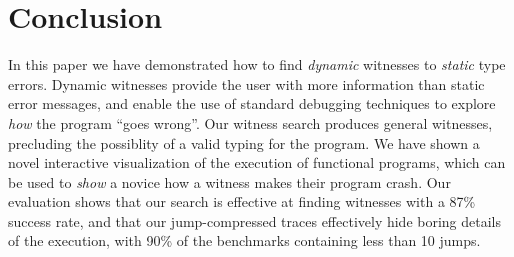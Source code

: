 \section{Conclusion}
\label{sec:conclusion}
In this paper we have demonstrated how to find \emph{dynamic} witnesses
to \emph{static} type errors.
%
Dynamic witnesses provide the user with more information than static
error messages, and enable the use of standard debugging techniques
to explore \emph{how} the program ``goes wrong''.
%
Our witness search produces general witnesses, precluding the
possiblity of a valid typing for the program.
%
We have shown a novel interactive visualization of the execution of
functional programs, which can be used to \emph{show} a novice how a
witness makes their program crash.
%
Our evaluation shows that our search is effective at finding witnesses
with a 87\% success rate, and that our jump-compressed traces
effectively hide boring details of the execution, with 90\% of the
benchmarks containing less than 10 jumps.

